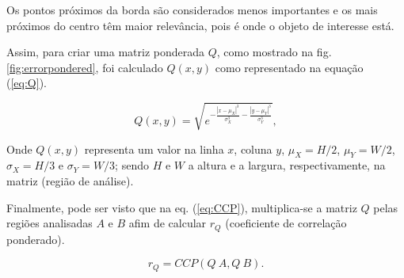 Os pontos próximos da borda são considerados menos importantes e os mais próximos do centro 
têm maior relevância, pois é onde o objeto de interesse está.

Assim, para criar uma matriz ponderada $Q$, como mostrado na fig. \ref{fig:errorpondered},
foi calculado $Q(x,y)$ como representado na equação (\ref{eq:Q}).

\begin{equation}\label{eq:Q}
 Q(x,y) = \sqrt{e^{ -\frac{|x-\mu_X|^3}{\sigma_X^3}-\frac{|y-\mu_Y|^3}{\sigma_Y^3}  }},
\end{equation}

Onde $Q(x,y)$ representa um valor na linha $x$, coluna $y$,
$\mu_X=H/2$, $\mu_Y=W/2$, $\sigma_X=H/3$ e $\sigma_Y=W/3$; sendo $H$ e $W$
a altura e a largura, respectivamente, na matriz (região de análise).

Finalmente, pode ser visto que na eq. (\ref{eq:CCP}), multiplica-se a matriz $Q$ pelas 
regiões analisadas $A$ e $B$ afim de calcular $r_Q$ (coeficiente de correlação ponderado).

\begin{equation}\label{eq:rw}
 r_Q = CCP(Q~A, Q~B).
\end{equation}
